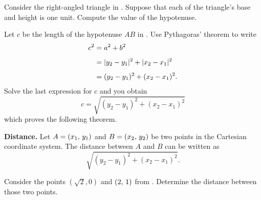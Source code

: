 \documentclass[a4paper,oneside,12pt]{article}
\begin{document}
\begin{exercise}
Consider the right-angled triangle in
.  Suppose that each of the
triangle's base and height is one unit.  Compute the value of the
hypotenuse.
\end{exercise}

Let $c$ be the length of the hypotenuse $AB$ in
.  Use Pythagoras' theorem to
write
\begin{align*}
c^2
&=
a^2 + b^2 \\[4pt]
&=
\lvert y_2 - y_1\rvert^2 + \lvert x_2 - x_1\rvert^2 \\[4pt]
&=
(y_2 - y_1)^2 + (x_2 - x_1)^2.
\end{align*}
Solve the last expression for $c$ and you obtain
\[
c
=
\sqrt{
  (y_2 - y_1)^2
  +
  (x_2 - x_1)^2
}
\]
which proves the following theorem.

\begin{theorem}
\label{thm:distance_between_two_points}
\textbf{Distance.}
Let $A = \left\lparen{x_1},\, {y_1}\right\rparen$ and $B = \left\lparen{x_2},\, {y_2}\right\rparen$ be two points in
the Cartesian coordinate system.  The distance between $A$ and $B$ can
be written as
\[
\sqrt{
  (y_2 - y_1)^2
  +
  (x_2 - x_1)^2
}.
\]
\end{theorem}

\begin{exercise}
Consider the points $(\sqrt{2}\comma 0)$ and $\left\lparen{2},\, {1}\right\rparen$ from
.  Determine the distance
between those two points.
\end{exercise}

\end{document}
